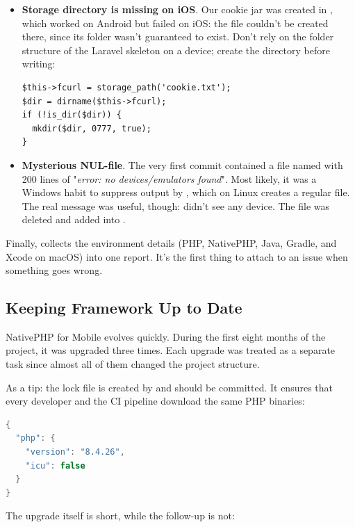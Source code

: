 \begin{itemize}
  \item \textbf{Storage directory is missing on iOS}. Our cookie jar was created in
  , which worked on Android but failed on iOS: the file
  couldn't be created there, since its folder wasn't guaranteed to exist. Don't rely on the
  folder structure of the Laravel skeleton on a device; create the directory before writing:

\begin{lstlisting}
$this->fcurl = storage_path('cookie.txt');
$dir = dirname($this->fcurl);
if (!is_dir($dir)) {
  mkdir($dir, 0777, true);
}
\end{lstlisting}

  \item \textbf{Mysterious NUL-file}. The very first commit contained a file named  with
  200 lines of "\emph{error: no devices/emulators found}". Most likely, it was a Windows habit to
  suppress output by , which on Linux creates a regular file. The real message was
  useful, though:  didn't see any device. The file was deleted and added into
  .
\end{itemize}

\noindent Finally,  collects the environment details (PHP, NativePHP,
Java, Gradle, and Xcode on macOS) into one report. It's the first thing to attach to an issue
when something goes wrong.


\subsection{Keeping Framework Up to Date}

NativePHP for Mobile evolves quickly. During the first eight months of the project, it was
upgraded three times. Each upgrade was treated as a separate task since almost all of them
changed the project structure.

As a tip: the lock file is created by  and should be committed. It ensures
that every developer and the CI pipeline download the same PHP binaries:

\begin{lstlisting}[language=java]
{
  "php": {
    "version": "8.4.26",
    "icu": false
  }
}
\end{lstlisting}

\noindent The upgrade itself is short, while the follow-up is not:

